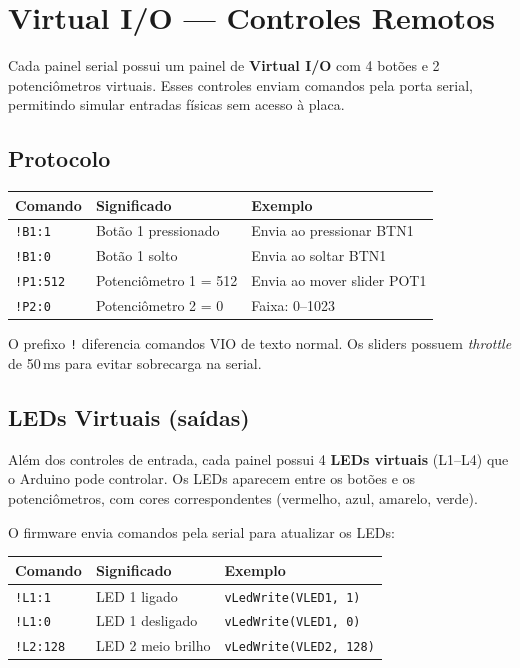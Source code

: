 \documentclass[12pt,a4paper]{article}
\begin{document}
\section{Virtual I/O --- Controles Remotos}
\label{sec:virtualio}

Cada painel serial possui um painel de \textbf{Virtual I/O} com 4 botões e 2 potenciômetros virtuais. Esses controles enviam comandos pela porta serial, permitindo simular entradas físicas sem acesso à placa.

\subsection{Protocolo}

\begin{center}
\begin{tabular}{lll}
  \toprule
  \textbf{Comando} & \textbf{Significado} & \textbf{Exemplo} \\
  \midrule
  \texttt{!B1:1} & Botão 1 pressionado & Envia ao pressionar BTN1 \\
  \texttt{!B1:0} & Botão 1 solto & Envia ao soltar BTN1 \\
  \texttt{!P1:512} & Potenciômetro 1 = 512 & Envia ao mover slider POT1 \\
  \texttt{!P2:0} & Potenciômetro 2 = 0 & Faixa: 0--1023 \\
  \bottomrule
\end{tabular}
\end{center}

O prefixo \texttt{!} diferencia comandos VIO de texto normal. Os sliders possuem \emph{throttle} de 50\,ms para evitar sobrecarga na serial.

\subsection{LEDs Virtuais (saídas)}

Além dos controles de entrada, cada painel possui 4 \textbf{LEDs virtuais} (L1--L4) que o Arduino pode controlar. Os LEDs aparecem entre os botões e os potenciômetros, com cores correspondentes (vermelho, azul, amarelo, verde).

O firmware envia comandos pela serial para atualizar os LEDs:

\begin{center}
\begin{tabular}{lll}
  \toprule
  \textbf{Comando} & \textbf{Significado} & \textbf{Exemplo} \\
  \midrule
  \texttt{!L1:1} & LED 1 ligado & \texttt{vLedWrite(VLED1, 1)} \\
  \texttt{!L1:0} & LED 1 desligado & \texttt{vLedWrite(VLED1, 0)} \\
  \texttt{!L2:128} & LED 2 meio brilho & \texttt{vLedWrite(VLED2, 128)} \\
  \bottomrule
\end{tabular}
\end{center}
\end{document}
